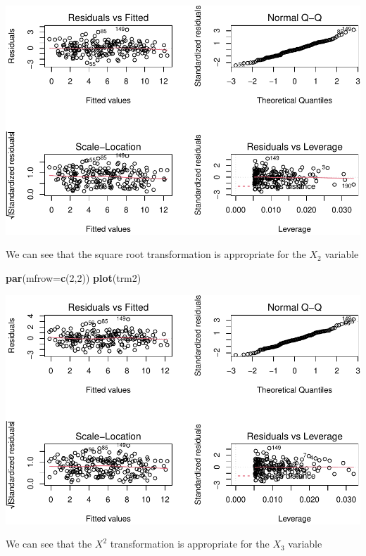 \documentclass[]{article}
\newenvironment{Shaded}{\begin{snugshade}}{\end{snugshade}}
\newcommand{\DataTypeTok}[1]{\textcolor[rgb]{0.13,0.29,0.53}{#1}}
\newcommand{\DecValTok}[1]{\textcolor[rgb]{0.00,0.00,0.81}{#1}}
\newcommand{\KeywordTok}[1]{\textcolor[rgb]{0.13,0.29,0.53}{\textbf{#1}}}
\newcommand{\NormalTok}[1]{#1}
\begin{document}
\includegraphics{./figures/unnamed-chunk-20-1.pdf}

We can see that the square root transformation is appropriate for the
\(X_{2}\) variable

\newpage

\begin{Shaded}
\begin{Highlighting}[]
\KeywordTok{par}\NormalTok{(}\DataTypeTok{mfrow=}\KeywordTok{c}\NormalTok{(}\DecValTok{2}\NormalTok{,}\DecValTok{2}\NormalTok{))}
\KeywordTok{plot}\NormalTok{(trm2)}
\end{Highlighting}
\end{Shaded}

\includegraphics{./figures/unnamed-chunk-21-1.pdf}

We can see that the \(X^{2}\) transformation is appropriate for the
\(X_{3}\) variable

\newpage
\end{document}
